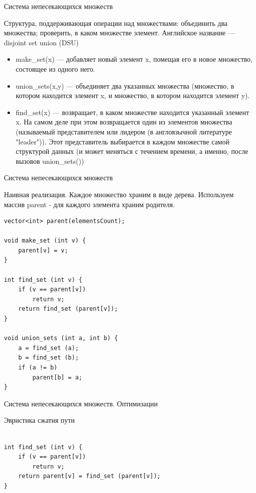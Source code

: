 \documentclass[10pt]{beamer}
\begin{document}
\begin{frame}[fragile]{Система непесекающихся множеств}

Структура, поддерживающая операции над множествами: объединить два множества; проверить, в каком множестве элемент.
Английское название — disjoint set union (DSU)

\begin{itemize}
    \item {\rm make\_set}(x) — добавляет новый элемент x, помещая его в новое множество, состоящее из одного него.
    \item {\rm union\_sets}(x,y) — объединяет два указанных множества (множество, в котором находится элемент x, и множество, в котором находится элемент y).
    \item {\rm find\_set}(x) — возвращает, в каком множестве находится указанный элемент x. На самом деле при этом возвращается один из элементов множества (называемый представителем или лидером (в англоязычной литературе "leader")). Этот представитель выбирается в каждом множестве самой структурой данных (и может меняться с течением времени, а именно, после вызовов {\rm union\_sets}())
\end{itemize}

\end{frame}

\begin{frame}[fragile]{Система непесекающихся множеств}

Наивная реализация. Каждое множество храним в виде дерева. Используем массив parent - для каждого элемента храним родителя.

\begin{lstlisting}
vector<int> parent(elementsCount);

void make_set (int v) {
	parent[v] = v;
}
 
int find_set (int v) {
	if (v == parent[v])
		return v;
	return find_set (parent[v]);
}
 
void union_sets (int a, int b) {
	a = find_set (a);
	b = find_set (b);
	if (a != b)
		parent[b] = a;
}
\end{lstlisting}
\end{frame}

\begin{frame}[fragile]{Система непесекающихся множеств. Оптимизации}

Эвристика сжатия пути

\begin{lstlisting}

int find_set (int v) {
	if (v == parent[v])
		return v;
	return parent[v] = find_set (parent[v]);
}
\end{lstlisting}
\end{frame}
\end{document}
